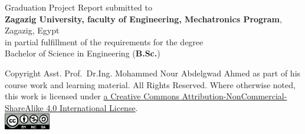 \newpage
{Graduation Project Report submitted to\\
    \textbf{Zagazig University, faculty of Engineering, Mechatronics Program}, Zagazig, Egypt\\
    in partial fulfillment of the requirements for the degree \\
    Bachelor of Science in Engineering (\textbf{B.Sc.})\\

    {\footnotesize
        Copyright  Asst. Prof. Dr.Ing. Mohammed Nour Abdelgwad Ahmed as part of his course work and learning material. All Rights Reserved. 
        Where otherwise noted, this work is licensed under 
        \href{https://creativecommons.org/licenses/by-nc-sa/4.0/}{ a Creative Commons Attribution-NonCommercial-ShareAlike 4.0 International License}.}\\
    \includegraphics[width=0.15\textwidth]{myFrontMatter/figures/byncsa}}\\

